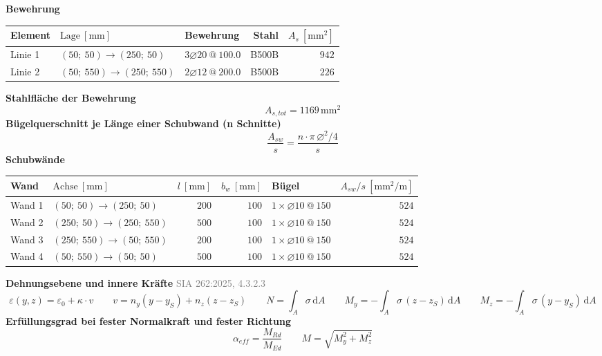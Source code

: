 \documentclass[11pt,a4paper]{article}
\newcommand{\normref}[1]{{\small\textcolor{gray}{#1}}}
\begin{document}
\noindent\textbf{Bewehrung}
\begin{longtable}{lllrr}
\hline
Element & $\text{Lage}\ [\mathrm{mm}]$ & Bewehrung & Stahl & $A_s\ [\mathrm{mm}^2]$ \\
\hline
\endhead
Linie 1 & $(50;\ 50) \rightarrow (250;\ 50)$ & $3 \varnothing 20\ @\ 100.0$ & B500B & $942$ \\
Linie 2 & $(50;\ 550) \rightarrow (250;\ 550)$ & $2 \varnothing 12\ @\ 200.0$ & B500B & $226$ \\
\hline
\end{longtable}
\noindent\textbf{Stahlfläche der Bewehrung}
\begin{equation*}
A_{s,tot} = 1169\,\mathrm{mm}^{2}
\end{equation*}
\noindent\textbf{Bügelquerschnitt je Länge einer Schubwand (n Schnitte)}
\begin{equation*}
\frac{A_{sw}}{s} = \frac{n \cdot \pi\, \varnothing^2 / 4}{s}
\end{equation*}
\noindent\textbf{Schubwände}
\begin{longtable}{llrrlr}
\hline
Wand & $\text{Achse}\ [\mathrm{mm}]$ & $l\ [\mathrm{mm}]$ & $b_w\ [\mathrm{mm}]$ & Bügel & $A_{sw}/s\ [\mathrm{mm}^2/\mathrm{m}]$ \\
\hline
\endhead
Wand 1 & $(50;\ 50) \rightarrow (250;\ 50)$ & $200$ & $100$ & $1 \times \varnothing 10\ @\ 150$ & $524$ \\
Wand 2 & $(250;\ 50) \rightarrow (250;\ 550)$ & $500$ & $100$ & $1 \times \varnothing 10\ @\ 150$ & $524$ \\
Wand 3 & $(250;\ 550) \rightarrow (50;\ 550)$ & $200$ & $100$ & $1 \times \varnothing 10\ @\ 150$ & $524$ \\
Wand 4 & $(50;\ 550) \rightarrow (50;\ 50)$ & $500$ & $100$ & $1 \times \varnothing 10\ @\ 150$ & $524$ \\
\hline
\end{longtable}
\noindent\textbf{Dehnungsebene und innere Kräfte} \hfill \normref{SIA 262:2025, 4.3.2.3}
\begin{equation*}
\varepsilon(y, z) = \varepsilon_0 + \kappa \cdot v \qquad v = n_y (y - y_S) + n_z (z - z_S) \qquad N = \int_A \sigma\,\mathrm{d}A \qquad M_y = -\int_A \sigma\,(z - z_S)\,\mathrm{d}A \qquad M_z = -\int_A \sigma\,(y - y_S)\,\mathrm{d}A
\end{equation*}
\noindent\textbf{Erfüllungsgrad bei fester Normalkraft und fester Richtung}
\begin{equation*}
\alpha_{eff} = \frac{M_{Rd}}{M_{Ed}} \qquad M = \sqrt{M_y^2 + M_z^2}
\end{equation*}
\end{document}
